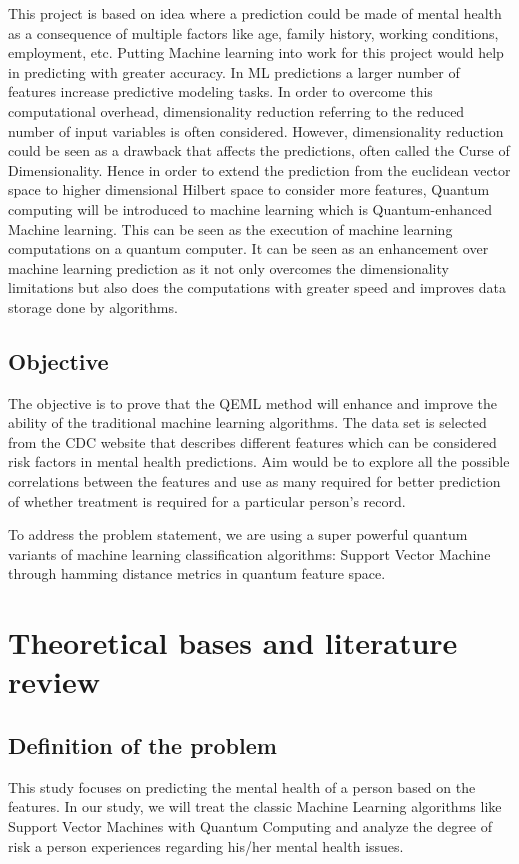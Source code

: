 \documentclass[10pt,journal,compsoc]{IEEEtran}
\begin{document}
\quad This project is based on idea where a prediction could be made of mental health as a consequence of multiple factors like age, family history, working conditions, employment, etc. Putting Machine learning into work for this project would help in predicting with greater accuracy. In ML predictions a larger number of features increase predictive modeling tasks. In order to overcome this computational overhead, dimensionality reduction referring to the reduced number of input variables is often considered. However, dimensionality reduction could be seen as a drawback that affects the predictions, often called the Curse of Dimensionality. Hence in order to extend the prediction from the euclidean vector space to higher dimensional Hilbert space to consider more features, Quantum computing  will be introduced to machine learning which is Quantum-enhanced Machine learning. This can be seen as the execution of machine learning computations on a quantum computer. It can be seen as an enhancement over machine learning prediction as it not only overcomes the dimensionality limitations but also does the computations with greater speed and improves data storage done by algorithms.

\subsection{Objective}
The objective is to prove that the QEML method will enhance and improve the ability of the traditional machine learning algorithms. The data set is selected  from the CDC website that describes different features which can be considered risk factors in mental health predictions. Aim would be to explore all the possible correlations between the features and use as many required for better prediction of whether treatment is required for a particular person's record. 

\quad To address the problem statement, we are using a super powerful quantum variants of machine learning classification algorithms: Support Vector Machine through hamming distance metrics in quantum feature space.

\section{Theoretical bases and literature review}

\subsection{Definition of the problem}
This study focuses on predicting the mental health of a person based on the features. In our study, we will treat the classic Machine Learning algorithms like Support Vector Machines with Quantum Computing and analyze the degree of risk a person experiences regarding his/her mental health issues.
\end{document}
